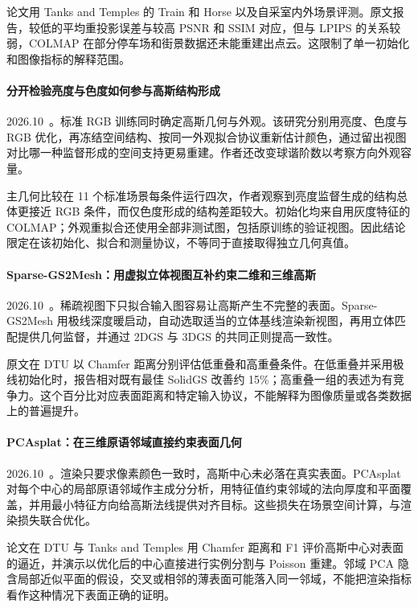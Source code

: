 论文用 Tanks and Temples 的 Train 和 Horse 以及自采室内外场景评测。原文报告，较低的平均重投影误差与较高 PSNR 和 SSIM 对应，但与 LPIPS 的关系较弱，COLMAP 在部分停车场和街景数据还未能重建出点云。这限制了单一初始化和图像指标的解释范围。

\paragraph{分开检验亮度与色度如何参与高斯结构形成}
2026.10~\cite{2610_00749}。标准 RGB 训练同时确定高斯几何与外观。该研究分别用亮度、色度与 RGB 优化，再冻结空间结构、按同一外观拟合协议重新估计颜色，通过留出视图对比哪一种监督形成的空间支持更易重建。作者还改变球谐阶数以考察方向外观容量。

主几何比较在 11 个标准场景每条件运行四次，作者观察到亮度监督生成的结构总体更接近 RGB 条件，而仅色度形成的结构差距较大。初始化均来自用灰度特征的 COLMAP；外观重拟合还使用全部非测试图，包括原训练的验证视图。因此结论限定在该初始化、拟合和测量协议，不等同于直接取得独立几何真值。

\paragraph{Sparse-GS2Mesh：用虚拟立体视图互补约束二维和三维高斯}
2026.10~\cite{2610_04203}。稀疏视图下只拟合输入图容易让高斯产生不完整的表面。Sparse-GS2Mesh 用极线深度暖启动，自动选取适当的立体基线渲染新视图，再用立体匹配提供几何监督，并通过 2DGS 与 3DGS 的共同正则提高一致性。

原文在 DTU 以 Chamfer 距离分别评估低重叠和高重叠条件。在低重叠并采用极线初始化时，报告相对既有最佳 SolidGS 改善约 15\%；高重叠一组的表述为有竞争力。这个百分比对应表面距离和特定输入协议，不能解释为图像质量或各类数据上的普遍提升。

\paragraph{PCAsplat：在三维原语邻域直接约束表面几何}
2026.10~\cite{2610_11011}。渲染只要求像素颜色一致时，高斯中心未必落在真实表面。PCAsplat 对每个中心的局部原语邻域作主成分分析，用特征值约束邻域的法向厚度和平面覆盖，并用最小特征方向给高斯法线提供对齐目标。这些损失在场景空间计算，与渲染损失联合优化。

论文在 DTU 与 Tanks and Temples 用 Chamfer 距离和 F1 评价高斯中心对表面的逼近，并演示以优化后的中心直接进行实例分割与 Poisson 重建。邻域 PCA 隐含局部近似平面的假设，交叉或相邻的薄表面可能落入同一邻域，不能把渲染指标看作这种情况下表面正确的证明。

